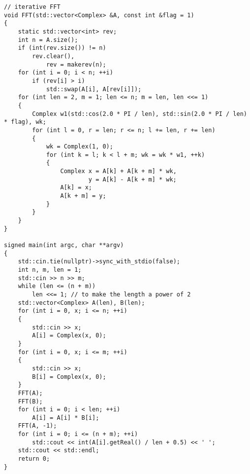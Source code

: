 \documentclass{ctexbook}  %
\begin{document}
\begin{Verbatim}[fontsize=\small]
// iterative FFT
void FFT(std::vector<Complex> &A, const int &flag = 1)
{
    static std::vector<int> rev;
    int n = A.size();
    if (int(rev.size()) != n)
        rev.clear(),
            rev = makerev(n);
    for (int i = 0; i < n; ++i)
        if (rev[i] > i)
            std::swap(A[i], A[rev[i]]);
    for (int len = 2, m = 1; len <= n; m = len, len <<= 1)
    {
        Complex w1(std::cos(2.0 * PI / len), std::sin(2.0 * PI / len) * flag), wk;
        for (int l = 0, r = len; r <= n; l += len, r += len)
        {
            wk = Complex(1, 0);
            for (int k = l; k < l + m; wk = wk * w1, ++k)
            {
                Complex x = A[k] + A[k + m] * wk,
                        y = A[k] - A[k + m] * wk;
                A[k] = x;
                A[k + m] = y;
            }
        }
    }
}

signed main(int argc, char **argv)
{
    std::cin.tie(nullptr)->sync_with_stdio(false);
    int n, m, len = 1;
    std::cin >> n >> m;
    while (len <= (n + m))
        len <<= 1; // to make the length a power of 2
    std::vector<Complex> A(len), B(len);
    for (int i = 0, x; i <= n; ++i)
    {
        std::cin >> x;
        A[i] = Complex(x, 0);
    }
    for (int i = 0, x; i <= m; ++i)
    {
        std::cin >> x;
        B[i] = Complex(x, 0);
    }
    FFT(A);
    FFT(B);
    for (int i = 0; i < len; ++i)
        A[i] = A[i] * B[i];
    FFT(A, -1);
    for (int i = 0; i <= (n + m); ++i)
        std::cout << int(A[i].getReal() / len + 0.5) << ' ';
    std::cout << std::endl;
    return 0;
}
\end{Verbatim}
\end{document}
